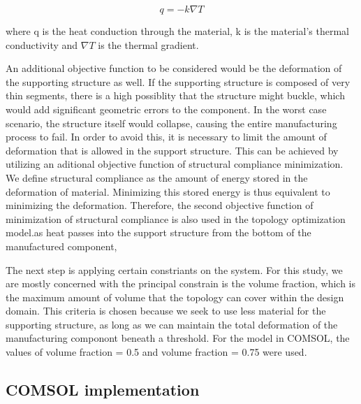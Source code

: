 \documentclass[../main.tex]{subfiles}
\begin{document}
\begin{equation}
  \label{eq:Fourier Law}
  q = -k \nabla T
\end{equation}

where q is the heat conduction through the material, k is the material's thermal conductivity and $\nabla T$ is the thermal gradient. 




An additional objective function to be considered would be the deformation of the supporting structure as well. If the supporting structure is composed of very thin segments, there is a high possiblity that the structure might buckle, which would add significant geometric errors to the component. In the worst case scenario, the structure itself would collapse, causing the entire manufacturing process to fail. In order to avoid this, it is necessary to limit the amount of deformation that is allowed in the support structure. This can be achieved by utilizing an aditional objective function of structural compliance minimization. We define structural compliance as the amount of energy stored in the deformation of material. Minimizing this stored energy is thus equivalent to minimizing the deformation.  Therefore, the second objective function of minimization of structural compliance is also used in the topology optimization model.as heat passes into the support structure from the bottom of the manufactured component,



The next step is applying certain constriants on the system. For this study, we are mostly concerned with the principal constrain is the volume fraction, which is the maximum amount of volume that the topology can cover within the design domain. This criteria is chosen because we seek to use less material for the supporting structure, as long as we can maintain the total deformation of the manufacturing componont beneath a threshold. For the model in COMSOL, the values of volume fraction = 0.5 and volume fraction = 0.75 were used.

\subsection{COMSOL implementation}
\end{document}
